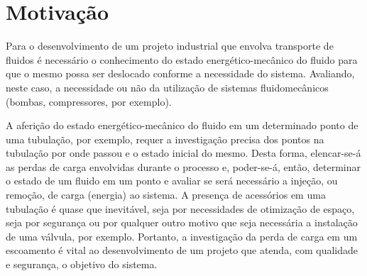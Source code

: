 \chapter{Motivação}\label{motivacao}

Para o desenvolvimento de um projeto industrial que envolva transporte de 
fluidos é necessário o conhecimento do
estado energético-mecânico do fluido para que o mesmo possa ser deslocado 
conforme a necessidade do sistema.  Avaliando,
neste caso, a necessidade ou não da utilização de sistemas fluidomecânicos 
(bombas, compressores, por exemplo). 

A aferição do estado energético-mecânico do fluido em um determinado ponto de 
uma tubulação, por exemplo, requer a
investigação precisa dos pontos na tubulação por onde passou e o estado 
inicial do mesmo. Desta forma, elencar-se-á as
perdas de carga envolvidas durante o processo e, poder-se-á, então, determinar 
o estado de um fluido em um ponto e
avaliar se será necessário a injeção, ou remoção, de carga (energia) ao 
sistema. A presença de acessórios em uma
tubulação é quase que inevitável, seja por necessidades de otimização de 
espaço, seja por segurança ou por qualquer
outro motivo que seja necessária a instalação de uma válvula, por exemplo. 
Portanto, a investigação da perda de carga em
um escoamento é vital ao desenvolvimento de um projeto que atenda, com 
qualidade e segurança, o objetivo do sistema.


